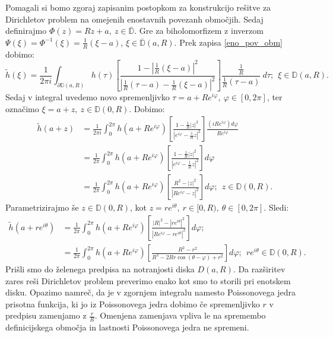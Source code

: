 \documentclass[mat1]{fmfdelo}
\begin{document}
     \begin{dokaz}
        Pomagali si bomo zgoraj zapisanim postopkom za konstrukcijo rešitve za \mbox{Dirichletov} problem na omejenih enostavnih povezanh območjih. 
        Sedaj definirajmo $\Phi(z) = Rz + a,~z \in \overline{\mathbb{D}}$. Gre za biholomorfizem z inverzom \mbox{$\Psi(\xi) = \Phi^{-1}(\xi) = \frac{1}{R}(\xi - a)$}, $\xi \in \overline{\mathbb{D}}(a,R)$.
        Prek zapisa \eqref{eno_pov_obm} dobimo:
        $$ 
        \widetilde{h}(\xi) = \frac{1}{2\pi i}\int_{\partial \mathbb{D}(a,R)}{h(\tau) \left[\frac{1 - |\frac{1}{R}(\xi - a)|^2}{|\frac{1}{R}(\tau - a) - \frac{1}{R}(\xi - a)|^2}\right]\frac{\frac{1}{R}}{\frac{1}{R}(\tau - a)}~d \tau};~~\xi \in \mathbb{D}(a,R). 
        $$
        Sedaj v integral uvedemo novo spremenljivko $\tau = a + Re^{i \varphi},~\varphi \in [0,2\pi]$, ter označimo $\xi = a + z,~z \in \mathbb{D}(0, R)$. Dobimo:
        \begin{align*}
            \widetilde{h}(a + z) &= \frac{1}{2\pi i}\int_{0}^{2 \pi}{h(a + R e^{i \varphi}) \left[\frac{1 - \frac{1}{R}|z|^2}{|e^{i \varphi} - \frac{1}{R} z|^2}\right]\frac{(i R e^{i \varphi}) d \varphi}{R e^{i \varphi}}}\\
            & = \frac{1}{2 \pi}\int_{0}^{2 \pi}{h(a + R e^{i \varphi}) \left[\frac{1 - \frac{1}{R}|z|^2}{|e^{i \varphi} - \frac{1}{R} z|^2}\right]d\varphi}\\
            & = \frac{1}{2 \pi}\int_{0}^{2 \pi}{h(a + R e^{i \varphi}) \left[\frac{R^2 - |z|^2}{|R e^{i \varphi} - z|^2}\right]d\varphi};~~z \in \mathbb{D}(0,R).
        \end{align*}
        Parametrizirajmo še $z \in \mathbb{D}(0,R)$, kot $z = r e^{i \theta},~r \in [0,R),~\theta \in [0,2 \pi]$. Sledi:
        \begin{align*}
            \widetilde{h}(a + r e^{i \theta}) &= \frac{1}{2 \pi}\int_{0}^{2 \pi}{h(a + R e^{i \varphi}) \left[\frac{|R|^2 - |r e^{i \theta}|^2}{|R e^{i \varphi} - r e^{i \theta}|^2}\right]d\varphi}; \\
            & = \frac{1}{2 \pi}\int_{0}^{2 \pi}{h(a + R e^{i \varphi}) \left[\frac{R^2 - r^2}{R^2 - 2Rr \cos(\theta - \varphi) + r^2}\right]d\varphi};~~r e^{i \theta} \in \mathbb{D}(0,R).
        \end{align*}
        Prišli smo do želenega predpisa na notranjosti diska $D(a,R)$. Da razširitev zares reši Dirichletov problem preverimo enako kot smo to storili pri enotskem disku. 
        Opazimo namreč, da je v zgornjem integralu namesto Poissonovega jedra prisotna funkcija, ki jo iz Poissonovega jedra dobimo če spremenljivko $r$ v predpisu zamenjamo z $\frac{r}{R}$. 
        Omenjena zamenjava vpliva le na spremembo definicijskega območja in lastnosti Poissonovega jedra ne spremeni.
     \end{dokaz}
\end{document}
